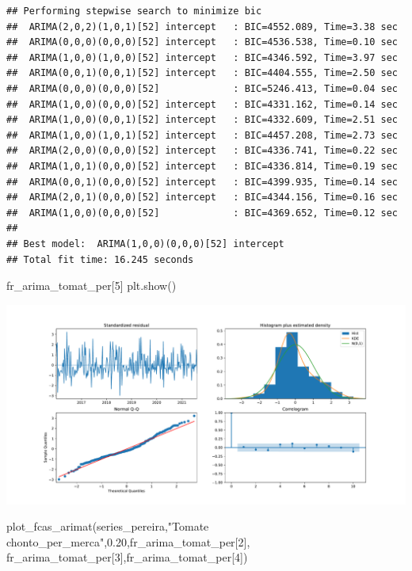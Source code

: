 \documentclass[
]{book}
\newenvironment{Shaded}{\begin{snugshade}}{\end{snugshade}}
\newcommand{\DecValTok}[1]{\textcolor[rgb]{0.00,0.00,0.81}{#1}}
\newcommand{\FloatTok}[1]{\textcolor[rgb]{0.00,0.00,0.81}{#1}}
\newcommand{\NormalTok}[1]{#1}
\newcommand{\StringTok}[1]{\textcolor[rgb]{0.31,0.60,0.02}{#1}}
\begin{document}
\begin{verbatim}
## Performing stepwise search to minimize bic
##  ARIMA(2,0,2)(1,0,1)[52] intercept   : BIC=4552.089, Time=3.38 sec
##  ARIMA(0,0,0)(0,0,0)[52] intercept   : BIC=4536.538, Time=0.10 sec
##  ARIMA(1,0,0)(1,0,0)[52] intercept   : BIC=4346.592, Time=3.97 sec
##  ARIMA(0,0,1)(0,0,1)[52] intercept   : BIC=4404.555, Time=2.50 sec
##  ARIMA(0,0,0)(0,0,0)[52]             : BIC=5246.413, Time=0.04 sec
##  ARIMA(1,0,0)(0,0,0)[52] intercept   : BIC=4331.162, Time=0.14 sec
##  ARIMA(1,0,0)(0,0,1)[52] intercept   : BIC=4332.609, Time=2.51 sec
##  ARIMA(1,0,0)(1,0,1)[52] intercept   : BIC=4457.208, Time=2.73 sec
##  ARIMA(2,0,0)(0,0,0)[52] intercept   : BIC=4336.741, Time=0.22 sec
##  ARIMA(1,0,1)(0,0,0)[52] intercept   : BIC=4336.814, Time=0.19 sec
##  ARIMA(0,0,1)(0,0,0)[52] intercept   : BIC=4399.935, Time=0.14 sec
##  ARIMA(2,0,1)(0,0,0)[52] intercept   : BIC=4344.156, Time=0.16 sec
##  ARIMA(1,0,0)(0,0,0)[52]             : BIC=4369.652, Time=0.12 sec
## 
## Best model:  ARIMA(1,0,0)(0,0,0)[52] intercept
## Total fit time: 16.245 seconds
\end{verbatim}

\begin{Shaded}
\begin{Highlighting}[]
\NormalTok{fr\_arima\_tomat\_per[}\DecValTok{5}\NormalTok{]}
\NormalTok{plt.show()}
\end{Highlighting}
\end{Shaded}

\includegraphics{bookdown-demo_files/figure-latex/unnamed-chunk-169-165.pdf}

\begin{Shaded}
\begin{Highlighting}[]


\NormalTok{plot\_fcas\_arimat(series\_pereira,}\StringTok{"Tomate chonto\_per\_merca"}\NormalTok{,}\FloatTok{0.20}\NormalTok{,fr\_arima\_tomat\_per[}\DecValTok{2}\NormalTok{],}
\NormalTok{fr\_arima\_tomat\_per[}\DecValTok{3}\NormalTok{],fr\_arima\_tomat\_per[}\DecValTok{4}\NormalTok{])}
\end{Highlighting}
\end{Shaded}
\end{document}
